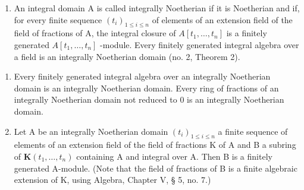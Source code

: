 \begin{enumerate}
\def\labelenumi{\arabic{enumi}.}
\setcounter{enumi}{5}
\tightlist
\item
  An integral domain A is called integrally Noetherian if it is Noetherian and if, for every finite sequence \((t_{i})_{1\leq i\leq n}\) of elements of an extension field of the field of fractions of A, the integral closure of \(A[t_{1},\ldots,t_{n}]\) is a finitely generated \(A[t_{1},\ldots,t_{n}]\) -module. Every finitely generated integral algebra over a field is an integrally Noetherian domain (no. 2, Theorem 2).
\end{enumerate}

\begin{enumerate}
\def\labelenumi{(\alph{enumi})}
\item
  Every finitely generated integral algebra over an integrally Noetherian domain is an integrally Noetherian domain. Every ring of fractions of an integrally Noetherian domain not reduced to 0 is an integrally Noetherian domain.
\item
  Let A be an integrally Noetherian domain \((t_{i})_{1\leq i\leq n}\) a finite sequence of elements of an extension field of the field of fractions K of A and B a subring of \(\mathbf{K}(t_{1},\ldots,t_{n})\) containing A and integral over A. Then B is a finitely generated A-module. (Note that the field of fractions of B is a finite algebraic extension of K, using Algebra, Chapter V, § 5, no. 7.)
\end{enumerate}

